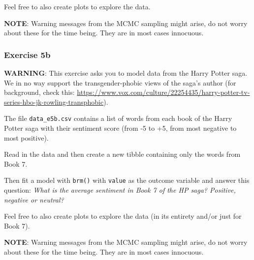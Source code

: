 \documentclass[
]{article}
\begin{document}
Feel free to also create plots to explore the data.

\textbf{NOTE}: Warning messages from the MCMC sampling might arise, do
not worry about these for the time being. They are in most cases
innocuous.

\subsubsection{Exercise 5b}\label{exercise-5b}

\textbf{WARNING}: This exercise asks you to model data from the Harry
Potter saga. We in no way support the transgender-phobic views of the
saga's author (for background, check this:
\url{https://www.vox.com/culture/22254435/harry-potter-tv-series-hbo-jk-rowling-transphobic}).

The file \texttt{data\_e5b.csv} contains a list of words from each book
of the Harry Potter saga with their sentiment score (from -5 to +5, from
most negative to most positive).

Read in the data and then create a new tibble containing only the words
from Book 7.

Then fit a model with \texttt{brm()} with \texttt{value} as the outcome
variable and answer this question: \emph{What is the average sentiment
in Book 7 of the HP saga? Positive, negative or neutral?}

Feel free to also create plots to explore the data (in its entirety
and/or just for Book 7).

\textbf{NOTE}: Warning messages from the MCMC sampling might arise, do
not worry about these for the time being. They are in most cases
innocuous.
\end{document}
